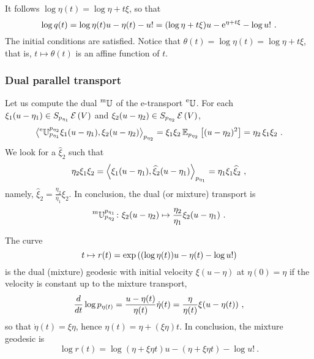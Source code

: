 \documentclass[12pt,a4paper]{amsart}
\theoremstyle{remark}
\begin{document}
It follows $\log \eta(t) = \log \eta + t \xi$, so that
\begin{equation}
  \label{eq:17}
  \log q(t) = \log \eta(t)u - \eta(t) - u! = (\log \eta + t \xi) u - \euler^{\eta + t \xi} - \log u! \ . 
\end{equation}
The initial conditions are satisfied. Notice that $\theta(t) = \log \eta(t) = \log \eta + t \xi$, that is, $t \mapsto \theta(t)$ is an affine function of $t$.

\subsubsection{Dual parallel transport}
Let us compute the dual $\prescript{\text{m}}{} {\mathbb U} _ {} ^ {}$ of the e-transport $\prescript{\text{e}}{} {\mathbb U} _ {} ^ {}$. For each $\xi_1(u - \eta_1) \in S_{p_{\eta_1}}\operatorname{\mathcal E}\left(V\right)$ and $\xi_2(u - \eta_2) \in S_{p_{\eta_2}}\operatorname{\mathcal E}\left(V\right)$,
\begin{equation}
  \label{eq:4}
  \scalarat {p_{\eta_2}} {\etransport {p_{\eta_1}}{p_{\eta_2}} \xi_1(u - \eta_1)} {\xi_2(u - \eta_2)} = \xi_1 \xi_2 \expectat {p_{\eta_2}} {(u - \eta_2)^2} =  \eta_2\,\xi_1 \xi_2 \ .
\end{equation}
We look for a $\widehat{\xi}_2$ such that
\begin{equation}
  \label{eq:7}
   \eta_2 \xi_1\xi_2 = \scalarat {p_{\eta_1}} {\xi_1(u - \eta_1)}{\widehat{\xi}_2(u - \eta_1)} = \eta_1 \xi_1 \widehat{\xi}_2 \ ,
\end{equation}
namely, $\widehat{\xi}_2 = \frac {\eta_2}{\eta_1} \xi_2$. In conclusion, the dual (or mixture) transport is
\begin{equation}
  \label{eq:18}
  \mtransport {p_{\eta_2}}{p_{\eta_1}} \colon \xi_2(u - \eta_2) \mapsto \frac {\eta_2}{\eta_1} \xi_2 (u - \eta_1) \ .
\end{equation}

The curve
\begin{equation}
    t \mapsto r(t) = \exp\left((\log \eta(t))u - \eta(t) - \log u!\right)
\end{equation}
is the dual (mixture) geodesic with initial velocity $\xi (u - \eta)$ at $\eta(0) = \eta$ if the velocity is constant up to the mixture transport,
\begin{equation}
  \label{eq:19}
  \derivby t \log p_{\eta(t)} = \frac {u - \eta(t)} {\eta(t)} \dot \eta(t)=  \frac \eta {\eta(t)}\xi (u - \eta(t)) \ ,  
\end{equation}
so that $\dot \eta(t) = \xi \eta$, hence $\eta(t) = \eta + (\xi \eta) t$. In conclusion, the mixture geodesic is
\begin{equation}
  \label{eq:23}
  \log r(t) = \log (\eta + \xi \eta t)u - (\eta + \xi \eta t) - \log u! \ .
\end{equation}
\end{document}
